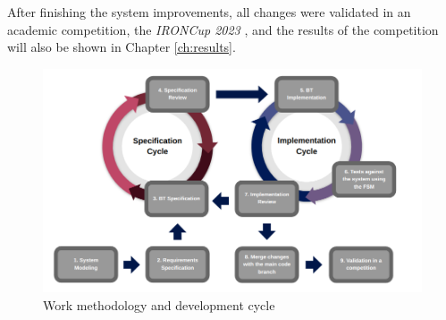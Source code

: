 After finishing the system improvements, all changes were validated in an academic competition, the \textit{IRONCup 2023} \cite{IRONCup2023}, and the results of the competition will also be shown in Chapter \ref{ch:results}.

\begin{figure}
    \centering
    \includegraphics[width=\linewidth]{images/Methodology.png}
    \caption{Work methodology and development cycle}
    \label{fig:methodology}
\end{figure}
